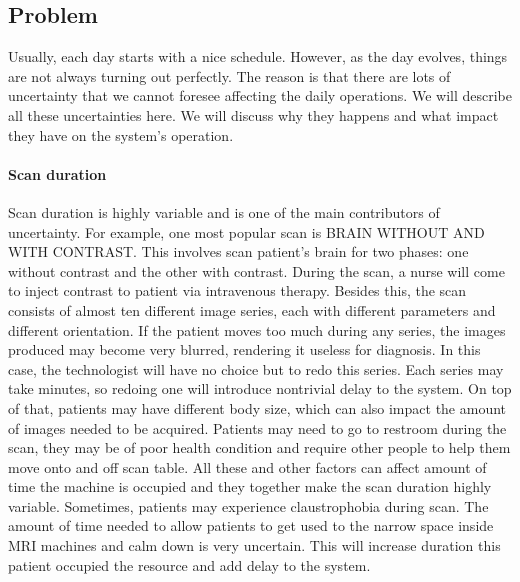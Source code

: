 \subsection{Problem}

Usually, each day starts with a nice schedule. However, as the day evolves, things are not always turning out perfectly. The reason is that there are lots of uncertainty that we cannot foresee affecting the daily operations. We will describe all these uncertainties here. We will discuss why they happens and what impact they have on the system's operation.

\paragraph{Scan duration} Scan duration is highly variable and is one of the main contributors of uncertainty. For example, one most popular scan is BRAIN WITHOUT AND WITH CONTRAST. This involves scan patient's brain for two phases: one without contrast and the other with contrast. During the scan, a nurse will come to inject contrast to patient via intravenous therapy. Besides this, the scan consists of almost ten different image series, each with different parameters and different orientation. If the patient moves too much during any series, the images produced may become very blurred, rendering it useless for diagnosis. In this case, the technologist will have no choice but to redo this series. Each series may take minutes, so redoing one will introduce nontrivial delay to the system. On top of that, patients may have different body size, which can also impact the amount of images needed to be acquired. Patients may need to go to restroom during the scan, they may be of poor health condition and require other people to help them move onto and off scan table. All these and other factors can affect amount of time the machine is occupied and they together make the scan duration highly variable. Sometimes, patients may experience claustrophobia during scan. The amount of time needed to allow patients to get used to the narrow space inside MRI machines and calm down is very uncertain. This will increase duration this patient occupied the resource and add delay to the system.

